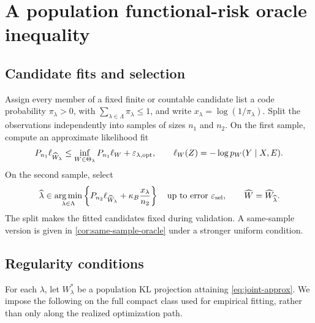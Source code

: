 \section{A population functional-risk oracle inequality}
\label{sec:oracle}

\subsection{Candidate fits and selection}

Assign every member of a fixed finite or countable candidate list a code probability \(\pi_\lambda>0\), with \(\sum_{\lambda\in\Lambda}\pi_\lambda\le1\), and write \(x_\lambda=\log(1/\pi_\lambda)\). Split the observations independently into samples of sizes \(n_1\) and \(n_2\). On the first sample, compute an approximate likelihood fit
\begin{equation}
 P_{n_1}\ell_{\widehat W_\lambda}
 \le \inf_{W\in\Theta_\lambda}P_{n_1}\ell_W
 +\varepsilon_{\lambda,\mathrm{opt}},
 \qquad \ell_W(Z)=-\log p_W(Y\mid X,E).
 \label{eq:within-fit}
\end{equation}
On the second sample, select
\begin{equation}
 \widehat\lambda\in\operatorname*{arg\,min}_{\lambda\in\Lambda}
 \left\{P_{n_2}\ell_{\widehat W_\lambda}
       +\kappa_B\frac{x_\lambda}{n_2}\right\}
 \quad\text{up to error }\varepsilon_{\mathrm{sel}},
 \qquad \widehat W=\widehat W_{\widehat\lambda}.
 \label{eq:selector}
\end{equation}
The split makes the fitted candidates fixed during validation. A same-sample version is given in \cref{cor:same-sample-oracle} under a stronger uniform condition.

\subsection{Regularity conditions}

For each \(\lambda\), let \(W_\lambda^*\) be a population KL projection attaining \cref{eq:joint-approx}. We impose the following on the full compact class used for empirical fitting, rather than only along the realized optimization path.

